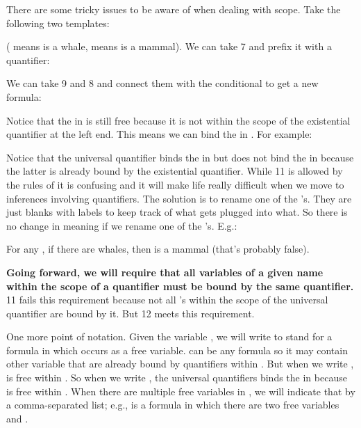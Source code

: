 There are some tricky issues to be aware of when dealing with scope. Take the 
following two templates:
\begin{argument}
 \aitem {}
 \aitem {} 
\end{argument}

( means  is a whale,  means  is a mammal).
We can take 7 and prefix it with a quantifier:
\begin{argument}
 \aitem {}
\end{argument}

We can take 9 and 8 and connect them with the conditional to get a new formula:

\begin{argument}
\aitem {}
\end{argument}

Notice that the  in  is still free because it is not within the scope 
of the existential quantifier at the left end. This means we can bind the  
in  . For example:

\begin{argument}
 \aitem {}
\end{argument}

Notice that the universal quantifier binds the  in  but does not bind 
the  in  because the latter  is already bound by the existential 
quantifier. While 11 is allowed by the rules of \lL[Q]{} it is confusing and it 
will make life really difficult when we move to inferences involving 
quantifiers.  The solution is to rename one of the 's.  They are just 
blanks with labels to keep track of what gets plugged into what.  So there is no 
change in meaning if we rename one of the 's. E.g.:

\begin{argument}
 \aitem {}
\end{argument}

For any , if there are whales, then  is a mammal (that's probably 
false).

\textbf{Going forward, we will require that all variables of a given name within 
the scope of a quantifier must be bound by the same quantifier.} 11 fails this 
requirement because not all  's within the scope of the universal 
quantifier are bound by it. But 12 meets this requirement. 

One more point of notation. Given the variable \p{\upsilon}, we will write 
\p{\phi(\upsilon)} to stand for a formula in which \p{\upsilon} occurs as a free 
variable.  \p{\phi} can be any formula so it may contain other variable that are 
already bound by quantifiers within \p{\phi}. But when we write 
\p{\phi(\upsilon)}, \p{\upsilon} is free within \p{\phi}. So when we write 
, the universal quantifiers binds the  in \p{\phi} 
because  is free within \p{\phi}. When there are multiple free variables in 
\p{\phi}, we will indicate that by a comma-separated list; e.g., 
 is a formula in which there are two free 
variables  and .

